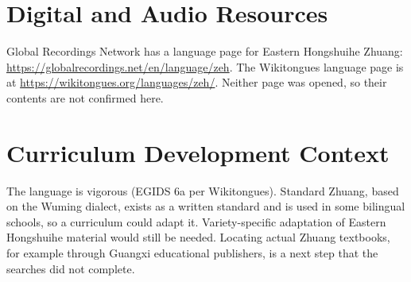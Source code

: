 \documentclass[12pt]{article}
\begin{document}
\section{Digital and Audio Resources}
Global Recordings Network has a language page for Eastern Hongshuihe Zhuang: \url{https://globalrecordings.net/en/language/zeh}. The Wikitongues language page is at \url{https://wikitongues.org/languages/zeh/}. Neither page was opened, so their contents are not confirmed here.

\section{Curriculum Development Context}
The language is vigorous (EGIDS 6a per Wikitongues). Standard Zhuang, based on the Wuming dialect, exists as a written standard and is used in some bilingual schools, so a curriculum could adapt it. Variety-specific adaptation of Eastern Hongshuihe material would still be needed. Locating actual Zhuang textbooks, for example through Guangxi educational publishers, is a next step that the searches did not complete.
\end{document}
